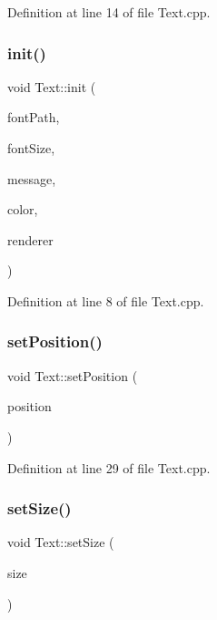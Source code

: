 Definition at line 14 of file Text.\+cpp.

\mbox{\label{class_text_ad97e6a6037eecb0777fd3fce47126610}} 
\subsubsection{init()}
{\footnotesize\ttfamily void Text\+::init (\begin{DoxyParamCaption}\item[{const std\+::string \&}]{font\+Path,  }\item[{int}]{font\+Size,  }\item[{const std\+::string \&}]{message,  }\item[{const S\+D\+L\+\_\+\+Color \&}]{color,  }\item[{S\+D\+L\+\_\+\+Renderer $\ast$}]{renderer }\end{DoxyParamCaption})}



Definition at line 8 of file Text.\+cpp.

\mbox{\label{class_text_a120c775b894251bb2c688a86effe533a}} 
\subsubsection{set\+Position()}
{\footnotesize\ttfamily void Text\+::set\+Position (\begin{DoxyParamCaption}\item[{const \textbf{ Vector2}$<$ float $>$ \&}]{position }\end{DoxyParamCaption})}



Definition at line 29 of file Text.\+cpp.

\mbox{\label{class_text_a8885062175c71c77542e3c05eabc4c30}} 
\subsubsection{set\+Size()}
{\footnotesize\ttfamily void Text\+::set\+Size (\begin{DoxyParamCaption}\item[{const \textbf{ Vector2}$<$ float $>$ \&}]{size }\end{DoxyParamCaption})}



